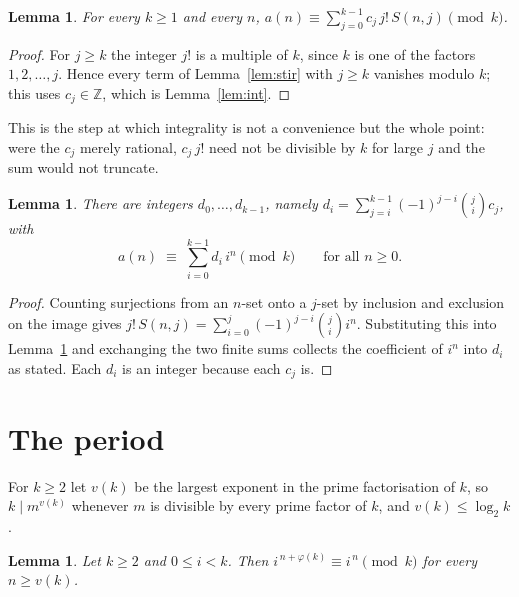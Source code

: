 \documentclass[11pt,a4paper]{article}
\theoremstyle{plain}
\newtheorem{lemma}[theorem]{Lemma}
\theoremstyle{definition}
\begin{document}
\begin{lemma}\label{lem:trunc}
For every $k\ge 1$ and every $n$,
$a(n)\equiv \sum_{j=0}^{k-1} c_j\, j!\, S(n,j) \pmod{k}$.
\end{lemma}

\begin{proof}
For $j\ge k$ the integer $j!$ is a multiple of $k$, since $k$ is one of the factors
$1,2,\dots,j$. Hence every term of Lemma~\ref{lem:stir} with $j\ge k$ vanishes modulo
$k$; this uses $c_j\in\mathbb{Z}$, which is Lemma~\ref{lem:int}.
\end{proof}

This is the step at which integrality is not a convenience but the whole point: were the
$c_j$ merely rational, $c_j\,j!$ need not be divisible by $k$ for large $j$ and the sum
would not truncate.

\begin{lemma}\label{lem:exp}
There are integers $d_0,\dots,d_{k-1}$, namely
$d_i=\sum_{j=i}^{k-1}(-1)^{j-i}\binom{j}{i}c_j$, with
\[
a(n)\;\equiv\;\sum_{i=0}^{k-1} d_i\, i^{n} \pmod{k}\qquad\text{for all } n\ge 0 .
\]
\end{lemma}

\begin{proof}
Counting surjections from an $n$-set onto a $j$-set by inclusion and exclusion on the
image gives $j!\,S(n,j)=\sum_{i=0}^{j}(-1)^{j-i}\binom{j}{i}i^{n}$. Substituting this
into Lemma~\ref{lem:trunc} and exchanging the two finite sums collects the coefficient of
$i^{n}$ into $d_i$ as stated. Each $d_i$ is an integer because each $c_j$ is.
\end{proof}

\section{The period}

For $k\ge 2$ let $v(k)$ be the largest exponent in the prime factorisation of $k$, so
$k\mid m^{v(k)}$ whenever $m$ is divisible by every prime factor of $k$, and
$v(k)\le\log_2 k$.

\begin{lemma}\label{lem:power}
Let $k\ge2$ and $0\le i<k$. Then $i^{\,n+\varphi(k)}\equiv i^{\,n}\pmod{k}$ for every
$n\ge v(k)$.
\end{lemma}
\end{document}
